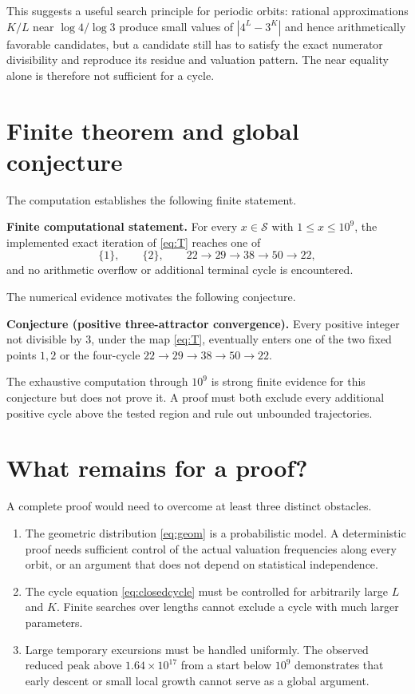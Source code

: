 \documentclass[11pt]{article}
\newcommand{\Sset}{\mathcal S}
\begin{document}
This suggests a useful search principle for periodic orbits: rational approximations $K/L$ near $\log4/\log3$ produce small values of $|4^L-3^K|$ and hence arithmetically favorable candidates, but a candidate still has to satisfy the exact numerator divisibility and reproduce its residue and valuation pattern.  The near equality alone is therefore not sufficient for a cycle.

\section{Finite theorem and global conjecture}
The computation establishes the following finite statement.

\medskip
\noindent\textbf{Finite computational statement.}
For every $x\in\Sset$ with $1\le x\le10^9$, the implemented exact iteration of \eqref{eq:T} reaches one of
\[
\{1\},\qquad\{2\},\qquad
22\to29\to38\to50\to22,
\]
and no arithmetic overflow or additional terminal cycle is encountered.
\medskip

The numerical evidence motivates the following conjecture.

\medskip
\noindent\textbf{Conjecture (positive three-attractor convergence).}
Every positive integer not divisible by $3$, under the map \eqref{eq:T}, eventually enters one of the two fixed points $1,2$ or the four-cycle $22\to29\to38\to50\to22$.
\medskip

The exhaustive computation through $10^9$ is strong finite evidence for this conjecture but does not prove it.  A proof must both exclude every additional positive cycle above the tested region and rule out unbounded trajectories.

\section{What remains for a proof?}
A complete proof would need to overcome at least three distinct obstacles.

\begin{enumerate}[leftmargin=2em]
\item The geometric distribution \eqref{eq:geom} is a probabilistic model.  A deterministic proof needs sufficient control of the actual valuation frequencies along every orbit, or an argument that does not depend on statistical independence.
\item The cycle equation \eqref{eq:closedcycle} must be controlled for arbitrarily large $L$ and $K$.  Finite searches over lengths cannot exclude a cycle with much larger parameters.
\item Large temporary excursions must be handled uniformly.  The observed reduced peak above $1.64\times10^{17}$ from a start below $10^9$ demonstrates that early descent or small local growth cannot serve as a global argument.
\end{enumerate}
\end{document}
